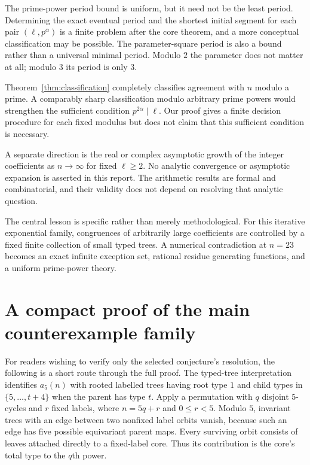 \documentclass[11pt,letterpaper]{article}
\theoremstyle{definition}
\theoremstyle{remark}
\begin{document}
The prime-power period bound is uniform, but it need not be the least
period. Determining the exact eventual period and the shortest initial
segment for each pair $(\ell,p^\alpha)$ is a finite problem after the
core theorem, and a more conceptual classification may be possible.
The parameter-square period is also a bound rather than a universal
minimal period. Modulo $2$ the parameter does not matter at all; modulo
$3$ its period is only $3$.

Theorem~\ref{thm:classification} completely classifies agreement with
$n$ modulo a prime. A comparably sharp classification modulo arbitrary
prime powers would strengthen the sufficient condition
$p^{2\alpha}\mid\ell$. Our proof gives a finite decision procedure for
each fixed modulus but does not claim that this sufficient condition is
necessary.

A separate direction is the real or complex asymptotic growth of the
integer coefficients as $n\to\infty$ for fixed $\ell\ge2$.
No analytic convergence or asymptotic expansion is asserted in this
report. The arithmetic results are formal and combinatorial, and their
validity does not depend on resolving that analytic question.

The central lesson is specific rather than merely methodological.
For this iterative exponential family, congruences of arbitrarily large
coefficients are controlled by a fixed finite collection of small typed
trees. A numerical contradiction at $n=23$ becomes an exact infinite
exception set, rational residue generating functions, and a uniform
prime-power theory.

\appendix
\section{A compact proof of the main counterexample family}
For readers wishing to verify only the selected conjecture's resolution,
the following is a short route through the full proof.
The typed-tree interpretation identifies $a_5(n)$ with rooted labelled
trees having root type $1$ and child types in $\{5,\ldots,t+4\}$ when
the parent has type $t$. Apply a permutation with $q$ disjoint $5$-cycles
and $r$ fixed labels, where $n=5q+r$ and $0\le r<5$.
Modulo $5$, invariant trees with an edge between two nonfixed label
orbits vanish, because such an edge has five possible equivariant
parent maps. Every surviving orbit consists of leaves attached directly
to a fixed-label core. Thus its contribution is the core's total type
to the $q$th power.
\end{document}
